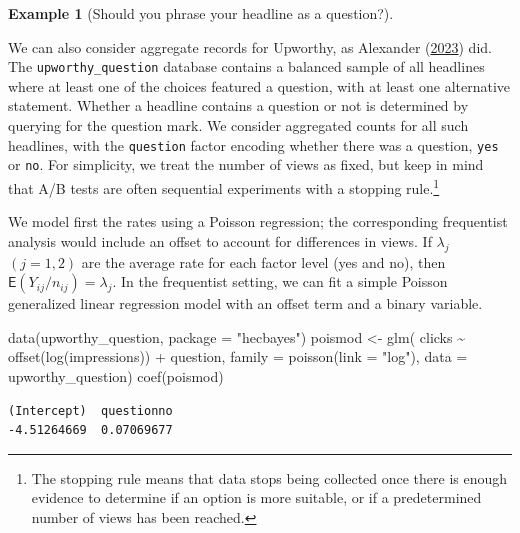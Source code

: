 \documentclass[
  11pt,
  letterpaper,
]{scrbook}
\newenvironment{Shaded}{\begin{snugshade}}{\end{snugshade}}
\newcommand{\AttributeTok}[1]{\textcolor[rgb]{0.40,0.45,0.13}{#1}}
\newcommand{\FunctionTok}[1]{\textcolor[rgb]{0.28,0.35,0.67}{#1}}
\newcommand{\NormalTok}[1]{\textcolor[rgb]{0.00,0.23,0.31}{#1}}
\newcommand{\OtherTok}[1]{\textcolor[rgb]{0.00,0.23,0.31}{#1}}
\newcommand{\SpecialCharTok}[1]{\textcolor[rgb]{0.37,0.37,0.37}{#1}}
\newcommand{\StringTok}[1]{\textcolor[rgb]{0.13,0.47,0.30}{#1}}
\theoremstyle{definition}
\newtheorem{example}{Example}[chapter]
\theoremstyle{definition}
\theoremstyle{definition}
\theoremstyle{plain}
\theoremstyle{remark}
\begin{document}
\begin{example}[Should you phrase your headline as a
question?]\protect\hypertarget{exm-poisson-upworthy-question}{}\label{exm-poisson-upworthy-question}

We can also consider aggregate records for Upworthy, as Alexander
(\protect\hyperlink{ref-Alexander:2023}{2023}) did. The
\texttt{upworthy\_question} database contains a balanced sample of all
headlines where at least one of the choices featured a question, with at
least one alternative statement. Whether a headline contains a question
or not is determined by querying for the question mark. We consider
aggregated counts for all such headlines, with the \texttt{question}
factor encoding whether there was a question, \texttt{yes} or
\texttt{no}. For simplicity, we treat the number of views as fixed, but
keep in mind that A/B tests are often sequential experiments with a
stopping rule.\footnote{The stopping rule means that data stops being
  collected once there is enough evidence to determine if an option is
  more suitable, or if a predetermined number of views has been reached.}

We model first the rates using a Poisson regression; the corresponding
frequentist analysis would include an offset to account for differences
in views. If \(\lambda_{j}\) \((j=1, 2)\) are the average rate for each
factor level (yes and no), then
\(\mathsf{E}(Y_{ij}/n_{ij}) = \lambda_j\). In the frequentist setting,
we can fit a simple Poisson generalized linear regression model with an
offset term and a binary variable.

\begin{Shaded}
\begin{Highlighting}[]
\FunctionTok{data}\NormalTok{(upworthy\_question, }\AttributeTok{package =} \StringTok{"hecbayes"}\NormalTok{)}
\NormalTok{poismod }\OtherTok{\textless{}{-}} \FunctionTok{glm}\NormalTok{(}
\NormalTok{  clicks }\SpecialCharTok{\textasciitilde{}} \FunctionTok{offset}\NormalTok{(}\FunctionTok{log}\NormalTok{(impressions)) }\SpecialCharTok{+}\NormalTok{ question, }
  \AttributeTok{family =} \FunctionTok{poisson}\NormalTok{(}\AttributeTok{link =} \StringTok{"log"}\NormalTok{),}
  \AttributeTok{data =}\NormalTok{ upworthy\_question)}
\FunctionTok{coef}\NormalTok{(poismod)}
\end{Highlighting}
\end{Shaded}

\begin{verbatim}
(Intercept)  questionno 
-4.51264669  0.07069677 
\end{verbatim}


\end{example}
\end{document}

